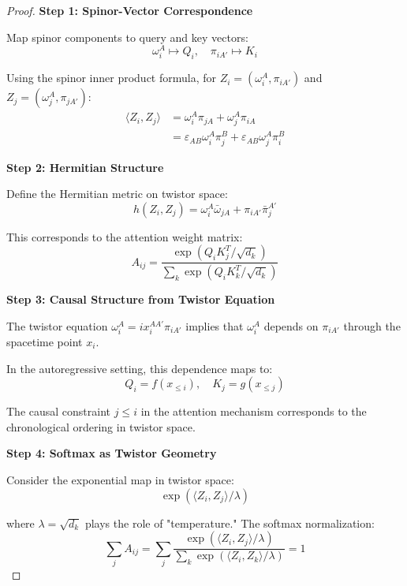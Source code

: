 \documentclass[12pt,a4paper]{article}
\theoremstyle{definition}
\begin{document}
\begin{proof}

\textbf{Step 1: Spinor-Vector Correspondence}

Map spinor components to query and key vectors:
\begin{equation}
\omega_i^A \mapsto Q_i, \quad \pi_{iA'} \mapsto K_i
\end{equation}

Using the spinor inner product formula, for $Z_i = (\omega_i^A, \pi_{iA'})$ and $Z_j = (\omega_j^A, \pi_{jA'})$:
\begin{align}
\langle Z_i, Z_j \rangle &= \omega_i^A \pi_{jA} + \omega_j^A \pi_{iA} \\
&= \varepsilon_{AB} \omega_i^A \pi_j^B + \varepsilon_{AB} \omega_j^A \pi_i^B
\end{align}

\textbf{Step 2: Hermitian Structure}

Define the Hermitian metric on twistor space:
\begin{equation}
h(Z_i, Z_j) = \omega_i^A \bar{\omega}_{jA} + \pi_{iA'} \bar{\pi}_j^{A'}
\end{equation}

This corresponds to the attention weight matrix:
\begin{equation}
A_{ij} = \frac{\exp(Q_i K_j^T / \sqrt{d_k})}{\sum_k \exp(Q_i K_k^T / \sqrt{d_k})}
\end{equation}

\textbf{Step 3: Causal Structure from Twistor Equation}

The twistor equation $\omega_i^A = i x_i^{AA'} \pi_{iA'}$ implies that $\omega_i^A$ depends on $\pi_{iA'}$ through the spacetime point $x_i$.

In the autoregressive setting, this dependence maps to:
\begin{equation}
Q_i = f(x_{\leq i}), \quad K_j = g(x_{\leq j})
\end{equation}

The causal constraint $j \leq i$ in the attention mechanism corresponds to the chronological ordering in twistor space.

\textbf{Step 4: Softmax as Twistor Geometry}

Consider the exponential map in twistor space:
\begin{equation}
\exp(\langle Z_i, Z_j \rangle / \lambda)
\end{equation}

where $\lambda = \sqrt{d_k}$ plays the role of "temperature." The softmax normalization:
\begin{equation}
\sum_j A_{ij} = \sum_j \frac{\exp(\langle Z_i, Z_j \rangle / \lambda)}{\sum_k \exp(\langle Z_i, Z_k \rangle / \lambda)} = 1
\end{equation}


\end{proof}
\end{document}
